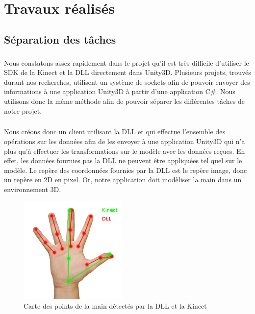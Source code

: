 \chapter{Travaux réalisés}

\section{Séparation des tâches}
\paragraph{}
Nous constatons assez rapidement dans le projet qu'il est très difficile d'utiliser
le SDK de la Kinect et la DLL directement dans Unity3D. Plusieurs projets, trouvés durant nos recherches, utilisent un système 
de sockets afin de pouvoir envoyer des informations à une application Unity3D à partir d'une application C\#.
Nous utilisons donc la même méthode afin de pouvoir séparer les différentes tâches de notre projet.

\paragraph{}
Nous créons donc un client utilisant la DLL et qui effectue l'ensemble des opérations sur les données afin
de les envoyer à une application Unity3D qui n'a plus qu'à effectuer les transformations sur le modèle avec
les données reçues. En effet, les données fournies pas la DLL ne peuvent être appliquées tel quel sur le modèle.
Le repère des coordonnées fournies par la DLL est le repère image, donc un repère en 2D en pixel. Or, notre 
application doit modèliser la main dans un environnement 3D.


\begin{figure}[H]
  \label{carte_main}
  \begin{center}
    \includegraphics[width=200px]{images/main2.png}
    \caption{Carte des points de la main détectés par la DLL et la Kinect}
  \end{center}
\end{figure}

